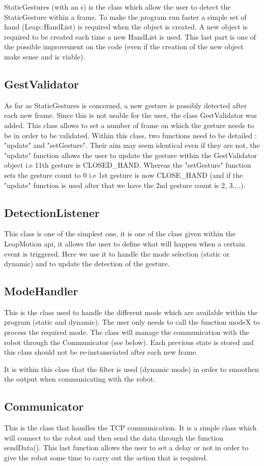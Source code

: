 StaticGestures (with an s) is the class which allow the user to detect the StaticGesture within a frame. To make the program run faster a simple set of hand (Leap::HandList) is required when the object is created. A new object is required to be created each time a new HandList is used. This last part is one of the possible improvement on the code (even if the creation of the new object make sense and is viable).

\subsection{GestValidator}

As far as StaticGestures is concerned, a new gesture is possibly detected after each new frame. Since this is not usable for the user, the class GestValidator was added. This class allows to set a number of frame on which the gesture needs to be in order to be validated.
Within this class, two functions need to be detailed : "update" and "setGesture". Their aim may seem identical even if they are not, the "update" function allows the user to update the gesture within the GestValidator object i.e 11th gesture is CLOSED\_HAND. Whereas the "setGesture" function sets the gesture count to 0 i.e 1st gesture is now CLOSE\_HAND (and if the "update" function is used after that we have the 2nd gesture count is 2, 3,...).

\subsection{DetectionListener}

This class is one of the simplest one, it is one of the class given within the LeapMotion api, it allows the user to define what will happen when a certain event is triggered.
Here we use it to handle the mode selection (static or dynamic) and to update the detection of the gesture.

\subsection{ModeHandler}

This is the class used to handle the different mode which are available within the program (static and dynamic). The user only needs to call the function modeX to process the required mode. The class will manage the communication with the robot through the Communicator (see below). Each previous state is stored and this class should not be re-instansciated after each new frame.

It is within this class that the filter is used (dynamic mode) in order to smoothen the output when communicating with the robot.

\subsection{Communicator}

This is the class that handles the TCP communication. It is a simple class which will connect to the robot and then send the data through the function sendData(). This last function allows the user to set a delay or not in order to give the robot some time to carry out the action that is required.
